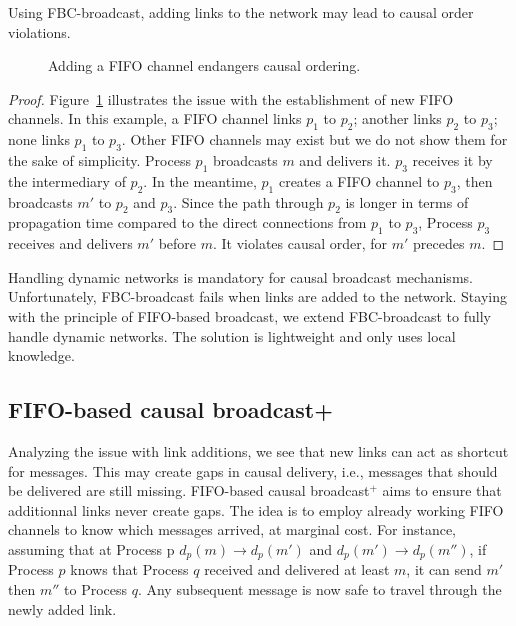 \begin{theorem}
  Using FBC-broadcast, adding links to the network may lead to causal order
  violations.
\end{theorem}

\begin{figure}
  \begin{center}
    
    \caption{\label{fig:problem}Adding a FIFO channel endangers causal
      ordering.}
  \end{center}
\end{figure}

\begin{proof}
  Figure~\ref{fig:problem} illustrates the issue with the establishment of new
  FIFO channels. In this example, a FIFO channel links $p_1$ to $p_2$; another
  links $p_2$ to $p_3$; none links $p_1$ to $p_3$. Other FIFO channels may exist
  but we do not show them for the sake of simplicity. Process $p_1$ broadcasts
  $m$ and delivers it. $p_3$ receives it by the intermediary of $p_2$. In the
  meantime, $p_1$ creates a FIFO channel to $p_3$, then broadcasts $m'$ to $p_2$
  and $p_3$. Since the path through $p_2$ is longer in terms of propagation time
  compared to the direct connections from $p_1$ to $p_3$, Process $p_3$ receives
  and delivers $m'$ before $m$. It violates causal order, for $m'$ precedes $m$.
\end{proof}

Handling dynamic networks is mandatory for causal broadcast
mechanisms. Unfortunately, FBC-broadcast fails when links are added to the
network. Staying with the principle of FIFO-based broadcast, we extend
FBC-broadcast to fully handle dynamic networks. The solution is lightweight and
only uses local knowledge.

\subsection{FIFO-based causal broadcast+}
\label{subsec:bufferbroadcast}

Analyzing the issue with link additions, we see that new links can act as
shortcut for messages. This may create gaps in causal delivery, i.e., messages
that should be delivered are still missing.  FIFO-based causal broadcast$^+$
aims to ensure that additionnal links never create gaps. The idea is to employ
already working FIFO channels to know which messages arrived, at marginal
cost. For instance, assuming that at Process p $d_p(m) \rightarrow d_p(m')$ and
$d_p(m') \rightarrow d_p(m'')$, if Process $p$ knows that Process $q$ received
and delivered at least $m$, it can send $m'$ then $m''$ to Process $q$. Any
subsequent message is now safe to travel through the newly added link.

